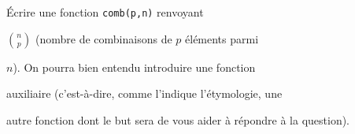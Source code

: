 \exer{}
\setcounter{numques}{0}

\question {}

Écrire une fonction \texttt{comb(p,n)} renvoyant

  $\binom{n}{p}$ (nombre de combinaisons de $p$ éléments parmi

  $n$). On pourra bien entendu introduire une fonction 

  auxiliaire (c'est-à-dire, comme l'indique l'étymologie, une

 autre fonction dont le but sera de vous aider à répondre à la question).